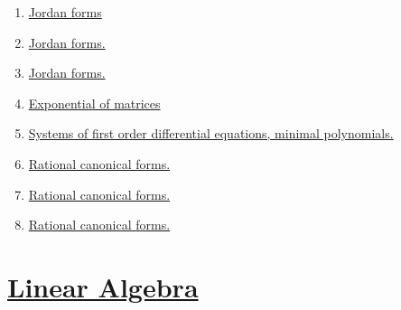 \documentclass[11pt]{article}
\begin{document}
\begin{enumerate}
	\item 	\href{https://mp.weixin.qq.com/s/k8XzFnoLgZ3yQNKZXd1AAA}{Jordan forms}	%
	\item 	\href{https://mp.weixin.qq.com/s/QQ7Oqc9ANBHyC33z1yEggQ}{Jordan forms.}	%
	\item	\href{https://mp.weixin.qq.com/s/WsoaH_FLlXWbsgqf_lGl5w}{Jordan forms.}	%
	\item	\href{https://mp.weixin.qq.com/s/Zpyb_fl5o87vgFPDa0H2uw}{Exponential of matrices}	%
	\item	\href{https://mp.weixin.qq.com/s/_oRQehQPlQiYys2ubaSY_A}{Systems of first order differential equations, minimal polynomials.} 	%
	\item 	\href{https://mp.weixin.qq.com/s/2WB-w89LycDRYP7qIXsnlQ}{Rational canonical forms.}	%
	\item 	\href{https://mp.weixin.qq.com/s/b0kNPvCT-WTeC-U9lfPFmQ}{Rational canonical forms.}	%
	\item 	\href{https://mp.weixin.qq.com/s/_kiBuvHcTNUpE_8AZhX8Hw}{Rational canonical forms.}	%
\end{enumerate}

\section*{\href{https://www.youtube.com/playlist?list=PLQqeHUV7RZ2NZTtKnbQ6v-IlgOP260HNk}{Linear Algebra }}
\end{document}
